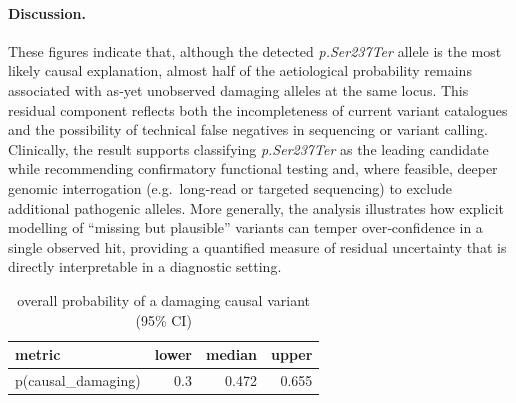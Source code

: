 \paragraph{Discussion.}
These figures indicate that, although the detected \textit{p.Ser237Ter} allele is the most likely causal explanation, almost half of the aetiological probability remains associated with as‑yet unobserved damaging alleles at the same locus.  This residual component reflects both the incompleteness of current variant catalogues and the possibility of technical false negatives in sequencing or variant calling.  Clinically, the result supports classifying \textit{p.Ser237Ter} as the leading candidate while recommending confirmatory functional testing and, where feasible, deeper genomic interrogation (e.g.\ long‑read or targeted sequencing) to exclude additional pathogenic alleles.  More generally, the analysis illustrates how explicit modelling of “missing but plausible” variants can temper over‑confidence in a single observed hit, providing a quantified measure of residual uncertainty that is directly interpretable in a diagnostic setting.


\begin{table}
\caption{overall probability of a damaging causal variant (95\% CI)}
\centering
\begin{tabular}[t]{lrrr}
\toprule
metric & lower & median & upper\\
\midrule
p(causal\_damaging) & 0.3 & 0.472 & 0.655\\
\bottomrule
\end{tabular}
\end{table} 


\begin{table}
\caption{per‑variant probabilities with 95\% credible intervals}
\centering
{}
\end{table} 

